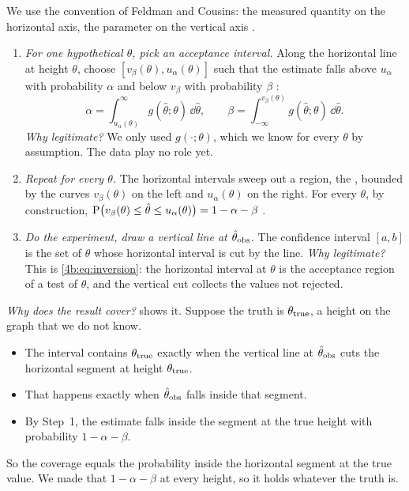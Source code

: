 We use the convention of Feldman and Cousins: the measured quantity on the
horizontal axis, the parameter on the vertical axis \cite{FeldmanCousins1998}.

\begin{enumerate}[label=\textbf{Step \arabic*.},leftmargin=*]
  \item \emph{For one hypothetical $\theta$, pick an acceptance interval.}
        Along the horizontal line at height $\theta$, choose
        $[v_\beta(\theta),u_\alpha(\theta)]$ such that the estimate falls above
        $u_\alpha$ with probability $\alpha$ and below $v_\beta$ with
        probability $\beta$ :
        \begin{equation}
          \alpha=\int_{u_\alpha(\theta)}^{\infty}g(\hat\theta;\theta)\,\dd\hat\theta,
          \qquad
          \beta=\int_{-\infty}^{v_\beta(\theta)}g(\hat\theta;\theta)\,\dd\hat\theta .
          \label{4b:eq:belt-edges}
        \end{equation}
        \emph{Why legitimate?} We only used $g(\cdot;\theta)$, which we know
        for every $\theta$ by assumption. The data play no role yet.
  \item \emph{Repeat for every $\theta$.} The horizontal intervals sweep out a
        region, the , bounded by the curves
        $v_\beta(\theta)$ on the left and $u_\alpha(\theta)$ on the right. For
        every $\theta$, by construction,
        $\operatorname{P}\bigl(v_\beta(\theta)\le\hat\theta\le u_\alpha(\theta)\bigr)=1-\alpha-\beta$
        .
  \item \emph{Do the experiment, draw a vertical line at $\hat\theta_{\rm
        obs}$.} The confidence interval $[a,b]$ is the set of $\theta$ whose
        horizontal interval is cut by the line.
        \emph{Why legitimate?} This is \eqref{4b:eq:inversion}: the horizontal
        interval at $\theta$ is the acceptance region of a test of $\theta$,
        and the vertical cut collects the values not rejected.
\end{enumerate}

\emph{Why does the result cover?}  shows it. Suppose the
truth is $\theta_{\rm true}$, a height on the graph that we do not know.
\begin{itemize}[itemsep=1pt,leftmargin=1.2em]
  \item The interval contains $\theta_{\rm true}$ exactly when the vertical
        line at $\hat\theta_{\rm obs}$ cuts the horizontal segment at height
        $\theta_{\rm true}$.
  \item That happens exactly when $\hat\theta_{\rm obs}$ falls inside that
        segment.
  \item By Step~1, the estimate falls inside the segment at the true height
        with probability $1-\alpha-\beta$.
\end{itemize}
So the coverage equals the probability inside the horizontal segment at the
true value. We made that $1-\alpha-\beta$ at every height, so it holds whatever
the truth is.


